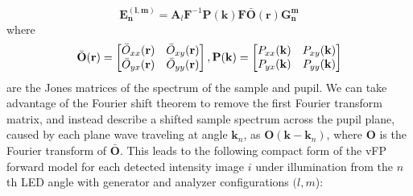 \documentclass{article}
\providecommand{\vk}{\mathbf{k}}
\providecommand{\vrr}{\mathbf{r}}
\providecommand{\vk}{\mathbf{k}}
\providecommand{\mP}{\mathbf{P}}
\providecommand{\mO}{\mathbf{O}}
\begin{document}
\newcommand{\Omatrix}{
  \begin{bmatrix}
   &\mkern-18mu O_{xx}(\vk) &O_{xy}(\vk) \\
   &\mkern-18mu O_{yx}(\vk) &O_{yy}(\vk) 
   \end{bmatrix}}
\newcommand{\OmatrixSpace}{
  \begin{bmatrix}
   &\mkern-18mu \bar{O}_{xx}(\vrr) &\bar{O}_{xy}(\vrr) \\
   &\mkern-18mu \bar{O}_{yx}(\vrr) &\bar{O}_{yy}(\vrr) 
   \end{bmatrix}}
\newcommand{\Pmatrix}{
  \begin{bmatrix}
   &\mkern-18mu P_{xx}(\vk) &P_{xy}(\vk) \\
   &\mkern-18mu P_{yx}(\vk) &P_{yy}(\vk) 
   \end{bmatrix}}
\newcommand{\Fmatrix}{
  \begin{bmatrix}
   &\mkern-18mu \mathcal{F}^{-1}_{2D} & 0 \\
   &\mkern-18mu 0 & \mathcal{F}^{-1}_{2D} 
   \end{bmatrix}}

\begin{equation} 
    \mathbf{E_n^{(l,m)}}=\mathbf{A}_l\mathbf{F}^{-1} \mathbf{P}(\mathbf{k})\mathbf{F}\mathbf{\bar{O}}(\mathbf{r})\mathbf{G_n^m}
\end{equation}
where 
\begin{equation}
   \bar{\mO}(\vrr) = \OmatrixSpace, \mP(\vk) = \Pmatrix
\end{equation}
are the Jones matrices of the spectrum of the sample and pupil. We can take advantage of the Fourier shift theorem to remove the first Fourier transform matrix, and instead describe a shifted sample spectrum across the pupil plane, caused by each plane wave traveling at angle $\vk_n$, as $\mathbf{O}(\mathbf{k}-\vk_n)$, where $\mathbf{O}$ is the Fourier transform of $\mathbf{\bar{O}}$. This leads to the following compact form of the vFP forward model for each detected intensity image $i$ under illumination from the $n$th LED angle with generator and analyzer configurations $(l,m$): 
\end{document}
